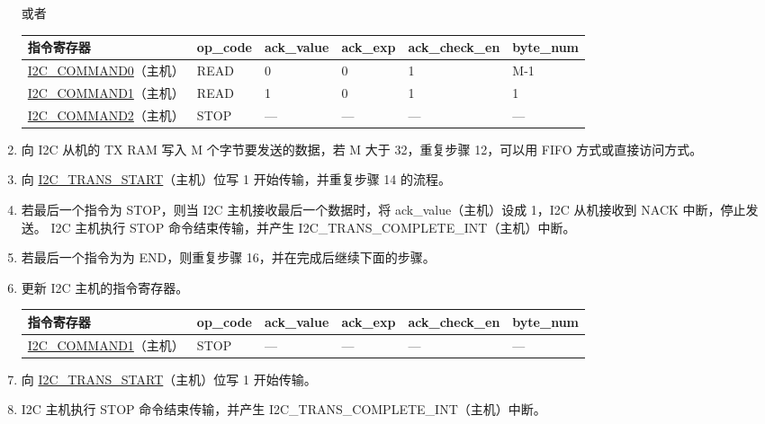 \documentclass[main\_\_CN.tex]{subfiles}
\begin{document}
\begin{enumerate}
或者

\begin{longtable}{ | p{4cm} | p{2cm} | p{2cm} | p{2cm} |p{2cm} | p{2cm} |}
\hline\rowcolor{lightgray}
指令寄存器& op\_code & ack\_value&ack\_exp&ack\_check\_en&byte\_num  \\ \hline
\hyperref[fielddesc:I2CCOMMAND0]{I2C\_COMMAND0}（主机）& READ& 0&0&1&M-1  \\ \hline
\hyperref[fielddesc:I2CCOMMAND1]{I2C\_COMMAND1}（主机）& READ& 1&0&1&1  \\ \hline
\hyperref[fielddesc:I2CCOMMAND2]{I2C\_COMMAND2}（主机）& STOP& ---&---&---&---  \\ \hline
\end{longtable}

\item 向 I2C 从机的 TX RAM 写入 M 个字节要发送的数据，若 M 大于 32，重复步骤 12，可以用 FIFO 方式或直接访问方式。
\item 向 \hyperref[fielddesc:I2CTRANSSTART]{I2C\_TRANS\_START}（主机）位写 1 开始传输，并重复步骤 14 的流程。
\item 若最后一个指令为 STOP，则当 I2C 主机接收最后一个数据时，将 ack\_value（主机）设成 1，I2C 从机接收到 NACK 中断，停止发送。 I2C 主机执行 STOP 命令结束传输，并产生 I2C\_TRANS\_COMPLETE\_INT（主机）中断。
\item 若最后一个指令为为 END，则重复步骤 16，并在完成后继续下面的步骤。
\item 更新 I2C 主机的指令寄存器。
\begin{longtable}{ | p{4cm} | p{2cm} | p{2cm} | p{2cm} |p{2cm} | p{2cm} |}
\hline\rowcolor{lightgray}
指令寄存器& op\_code & ack\_value&ack\_exp&ack\_check\_en&byte\_num  \\ \hline
\hyperref[fielddesc:I2CCOMMAND1]{I2C\_COMMAND1}（主机）& STOP& ---&---&---&---  \\ \hline
\end{longtable}
\item 向 \hyperref[fielddesc:I2CTRANSSTART]{I2C\_TRANS\_START}（主机）位写 1 开始传输。
\item I2C 主机执行 STOP 命令结束传输，并产生 I2C\_TRANS\_COMPLETE\_INT（主机）中断。

\end{enumerate}
\end{document}
